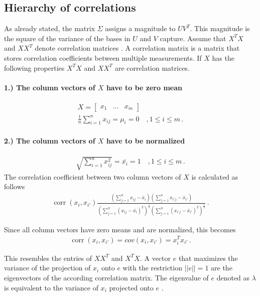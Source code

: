 \subsection{Hierarchy of correlations}
As already stated, the matrix \(\Sigma\) assigns a magnitude to \(UV^{T}\).
This magnitude is the square of the variance of the bases in \(U\) and \(V\) capture.
Assume that \(X^{T}X\) and \(XX^{T}\) denote correlation matrices
\cite{brunton_kutz_2019b}.
A correlation matrix is a matrix that stores correlation coefficients between multiple measurements. 
If \(X\) has the following properties \(X^{T}X\) and \(XX^{T}\) are correlation matrices.
\paragraph{1.) The column vectors of \(X\) have to be zero mean}
\begin{gather}
X = \begin{bmatrix}
x_1 & \hdots & x_m
\end{bmatrix} \\
\frac{1}{n}\sum_{i = 1}^{n} x_{ij} = \mu_{i} = 0 \quad , 1 \leq i \leq m \,.
\end{gather}
\paragraph{2.) The column vectors of \(X\) have to be normalized}
\begin{gather}
\sqrt{\sum_{i = 1}^{n} x_{ij}^{2}} = \bar{x_i} = 1 \quad , 1 \leq i \leq m \,.
\end{gather}
The correlation coefficient between two column vectors of \(X\) is calculated as follows \cite{Suga}
\begin{gather}
\operatorname{corr}(x_i, x_{i'})\frac{(\sum_{j = 1}^{n} x_{ij} - \bar{x}_i)(\sum_{j = 1}^{n} x_{i'j} - \bar{x}_{i'})}{(\sum_{j = 1}^{n} (x_{ij}- \bar{x_{i}})^{2})^{\frac{1}{2}}(\sum_{j = 1}^{n} (x_{i'j}-  \bar{x}_{i'})^{2})^{\frac{1}{2}}} \,.
\end{gather}



Since all column vectors have zero means and are normalized, this becomes \cite{harv}
\begin{gather}
\operatorname{corr}(x_i, x_{i'}) = cov(x_i, x_{i'})= x_i^{T}x_{i'} \,.
\end{gather}

This resembles the entries of \(XX^{T}\) and \(X^{T}X\).
A vector \(e\) that maximizes the variance of the projection of \(x_i\) onto \(e\)  with the restriction \(||e|| = 1\) are the eigenvectors of the according correlation matrix.
The eigenvalue of \(e\) denoted as \(\lambda\) is equivalent to the variance of \(x_i\) projected onto \(e\) \cite{Lavrenko}.

